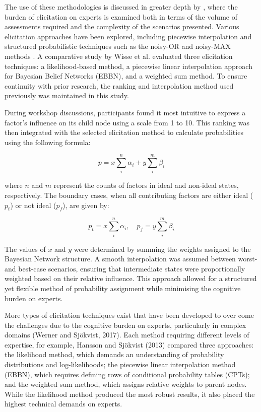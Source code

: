 \documentclass{article}
\begin{document}
The use of these methodologies is discussed in greater depth by \cite{werner2017expert}, where the burden of elicitation on experts is examined both in terms of the volume of assessments required and the complexity of the scenarios presented. Various elicitation approaches have been explored, including piecewise interpolation \cite{wisse2008elicit} and structured probabilistic techniques such as the noisy-OR and noisy-MAX methods \cite{diez1993parameter, pearl2014probabilistic}. A comparative study by Wisse et al. \cite{wisse2008relieving} evaluated three elicitation techniques: a likelihood-based method, a piecewise linear interpolation approach for Bayesian Belief Networks (EBBN), and a weighted sum method. To ensure continuity with prior research, the ranking and interpolation method used previously was maintained in this study.

During workshop discussions, participants found it most intuitive to express a factor's influence on its child node using a scale from 1 to 10. This ranking was then integrated with the selected elicitation method to calculate probabilities using the following formula:

\begin{equation} p = x \sum_{i}^{n} \alpha_{i} + y \sum_{i}^{m} \beta_{i} \end{equation}

where $n$ and $m$ represent the counts of factors in ideal and non-ideal states, respectively. The boundary cases, when all contributing factors are either ideal ($p_{t}$) or not ideal ($p_{f}$), are given by:

\begin{equation} p_t = x \sum_{i}^{n} \alpha_{i}, \quad p_f = y \sum_{i}^{m} \beta_{i} \end{equation}

The values of $x$ and $y$ were determined by summing the weights assigned to the Bayesian Network structure. A smooth interpolation was assumed between worst- and best-case scenarios, ensuring that intermediate states were proportionally weighted based on their relative influence. This approach allowed for a structured yet flexible method of probability assignment while minimising the cognitive burden on experts.

More types of elicitation techniques exist that have been developed to over come the challenges due to the cognitive burden on experts, particularly in complex domains (Werner and Sjökvist, 2017). Each method requiring different levels of expertise, for example, Hansson and Sjökvist (2013) compared three approaches: the likelihood method, which demands an understanding of probability distributions and log-likelihoods; the piecewise linear interpolation method (EBBN), which requires defining rows of conditional probability tables (CPTs); and the weighted sum method, which assigns relative weights to parent nodes. While the likelihood method produced the most robust results, it also placed the highest technical demands on experts.
\end{document}
